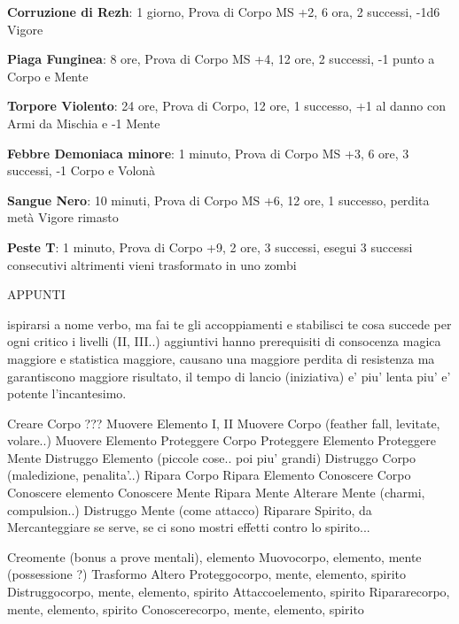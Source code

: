 \documentclass[12pt,a4paper,twoside,openany]{book}
\begin{document}
\begin{multicols}{2}
\textbf{Corruzione di Rezh}: 1 giorno, Prova di Corpo MS +2, 6 ora, 2 successi, -1d6 Vigore

\textbf{Piaga Funginea}: 8 ore, Prova di Corpo MS +4, 12 ore, 2 successi, -1 punto a Corpo e Mente

\textbf{Torpore Violento}: 24 ore, Prova di Corpo, 12 ore, 1 successo, +1 al danno con Armi da Mischia e -1 Mente

\textbf{Febbre Demoniaca minore}: 1 minuto, Prova di Corpo MS +3, 6 ore, 3 successi, -1 Corpo e Volonà

\textbf{Sangue Nero}: 10 minuti, Prova di Corpo MS +6, 12 ore, 1 successo, perdita metà Vigore rimasto

\textbf{Peste T}: 1 minuto, Prova di Corpo +9, 2 ore, 3 successi, esegui 3 successi consecutivi altrimenti vieni trasformato in uno zombi

\end{multicols}

\pagebreak



\pagebreak
\pagebreak


APPUNTI
\pagebreak
\pagebreak



ispirarsi a nome verbo, ma fai te gli accoppiamenti e stabilisci te cosa succede per ogni critico 
i livelli (II, III..) aggiuntivi hanno prerequisiti di consocenza magica maggiore e statistica maggiore, causano una maggiore perdita di resistenza ma garantiscono maggiore risultato, il tempo di lancio (iniziativa) e' piu' lenta piu' e' potente l'incantesimo.

Creare Corpo  ???
Muovere Elemento I, II
Muovere Corpo (feather fall, levitate, volare..)
Muovere Elemento
Proteggere Corpo
Proteggere Elemento 
Proteggere Mente
Distruggo Elemento (piccole cose.. poi piu' grandi)
Distruggo Corpo (maledizione, penalita'..)
Ripara Corpo
Ripara Elemento
Conoscere Corpo
Conoscere elemento
Conoscere Mente
Ripara Mente
Alterare Mente (charmi, compulsion..)
Distruggo Mente (come attacco)
Riparare Spirito, da Mercanteggiare se serve, se ci sono mostri effetti contro lo spirito...


Creomente (bonus a prove mentali), elemento
Muovocorpo, elemento, mente (possessione ?)
Trasformo
Altero
Proteggocorpo, mente, elemento, spirito
Distruggocorpo, mente, elemento, spirito
Attaccoelemento, spirito
Ripararecorpo, mente, elemento, spirito
Conoscerecorpo, mente, elemento, spirito
\end{document}
